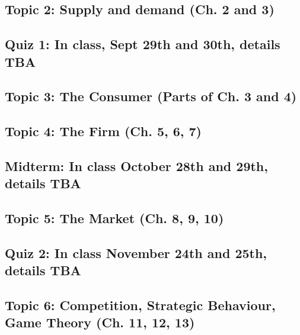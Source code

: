 \documentclass[11pt,]{article}
\begin{document}
\hypertarget{topic-2-supply-and-demand-ch.-2-and-3}{%
\subsection{Topic 2: Supply and demand (Ch. 2 and
3)}\label{topic-2-supply-and-demand-ch.-2-and-3}}

\hypertarget{quiz-1-in-class-sept-29th-and-30th-details-tba}{%
\subsection{Quiz 1: In class, Sept 29th and 30th, details
TBA}\label{quiz-1-in-class-sept-29th-and-30th-details-tba}}

\hypertarget{topic-3-the-consumer-parts-of-ch.-3-and-4}{%
\subsection{Topic 3: The Consumer (Parts of Ch. 3 and
4)}\label{topic-3-the-consumer-parts-of-ch.-3-and-4}}

\hypertarget{topic-4-the-firm-ch.-5-6-7}{%
\subsection{Topic 4: The Firm (Ch. 5, 6,
7)}\label{topic-4-the-firm-ch.-5-6-7}}

\hypertarget{midterm-in-class-october-28th-and-29th-details-tba}{%
\subsection{Midterm: In class October 28th and 29th, details
TBA}\label{midterm-in-class-october-28th-and-29th-details-tba}}

\hypertarget{topic-5-the-market-ch.-8-9-10}{%
\subsection{Topic 5: The Market (Ch. 8, 9,
10)}\label{topic-5-the-market-ch.-8-9-10}}

\hypertarget{quiz-2-in-class-november-24th-and-25th-details-tba}{%
\subsection{Quiz 2: In class November 24th and 25th, details
TBA}\label{quiz-2-in-class-november-24th-and-25th-details-tba}}

\hypertarget{topic-6-competition-strategic-behaviour-game-theory-ch.-11-12-13}{%
\subsection{Topic 6: Competition, Strategic Behaviour, Game Theory (Ch.
11, 12,
13)}\label{topic-6-competition-strategic-behaviour-game-theory-ch.-11-12-13}}
\end{document}
